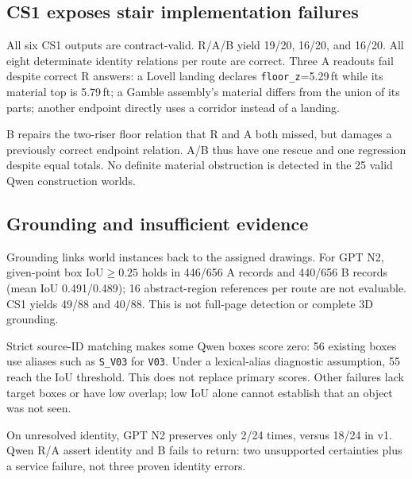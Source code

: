 \subsection{CS1 exposes stair implementation failures}
All six CS1 outputs are contract-valid. R/A/B yield 19/20, 16/20,
and 16/20. All eight determinate identity relations per route are
correct. Three A readouts fail despite correct R answers:
a Lovell landing declares \texttt{floor\_z}=5.29\,ft while its
material top is 5.79\,ft; a Gamble assembly's material differs from
the union of its parts; another endpoint directly uses a corridor
instead of a landing.

B repairs the two-riser floor relation that R and A both missed,
but damages a previously correct endpoint relation. A/B thus have
one rescue and one regression despite equal totals.
No definite material obstruction is detected in the 25 valid Qwen
construction worlds.

\subsection{Grounding and insufficient evidence}
Grounding links world instances back to the assigned drawings.
For GPT N2, given-point box IoU$\geq0.25$ holds in 446/656 A records
and 440/656 B records (mean IoU 0.491/0.489); 16 abstract-region
references per route are not evaluable. CS1 yields 49/88 and 40/88.
This is not full-page detection or complete 3D grounding.

Strict source-ID matching makes some Qwen boxes score zero:
56 existing boxes use aliases such as \texttt{S\_V03} for
\texttt{V03}. Under a lexical-alias diagnostic assumption, 55 reach
the IoU threshold. This does not replace primary scores.
Other failures lack target boxes or have low overlap; low IoU alone
cannot establish that an object was not seen.

On unresolved identity, GPT N2 preserves \unk{} only 2/24 times,
versus 18/24 in v1. Qwen R/A assert identity and B fails to return:
two unsupported certainties plus a service failure, not three proven
identity errors.
